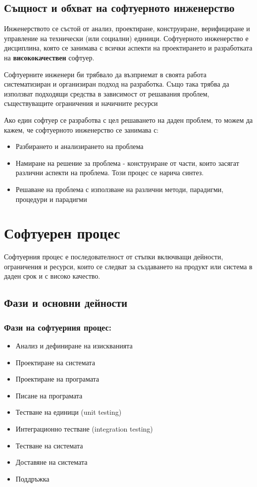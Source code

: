 \documentclass[fleqn,12pt]{article}
\begin{document}
\subsection{Същност и обхват на софтуерното инженерство}
Инженерството се състой от анализ, проектиране, конструиране, верифициране и управление на технически (или социални) единици. Софтуерното инженерство е дисциплина, която се занимава с всички аспекти на проектирането и разработката на \textbf{висококачествен} софтуер.

Софтуерните инженери би трябвало да възприемат в своята работа систематизиран и организиран подход на разработка. Също така трябва да използват подходящи средства в зависимост от решавания проблем, съществуващите ограничения и начичните ресурси

Ако един софтуер се разработва с цел решаването на даден проблем, то можем да кажем, че софтуерното инженерство се занимава с:
\begin{itemize}
	\item Разбирането и анализирането на проблема
	\item Намиране на решение за проблема - конструиране от части, които засягат различни аспекти на проблема. Този процес се нарича синтез.
	\item Решаване на проблема с използване на различни методи, парадигми, процедури и парадигми
\end{itemize}

\section{Софтуерен  процес}

Софтуерния процес е последователност от стъпки включващи дейности, ограничения и ресурси, които се следват за създаването на продукт или система в даден срок и с високо качество.

\subsection{Фази и  основни  дейности}
\subsubsection{Фази на софтуерния процес:}
\begin{itemize}
	\item Анализ и дефиниране на изискванията
	\item Проектиране на системата
	\item Проектиране на програмата
	\item Писане на програмата
	\item Тестване на единици (unit testing)
	\item Интеграционно тестване (integration testing)
	\item Тестване на системата
	\item Доставяне на системата
	\item Поддръжка
\end{itemize}
\end{document}

